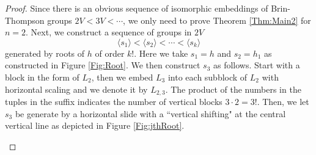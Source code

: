 \documentclass[10pt,a4paper]{amsart}
\begin{document}
\begin{proof} 
         Since there is an obvious sequence of isomorphic embeddings of 
         Brin-Thompson groups  $2V < 3V < \cdots$, 
         we only need to prove Theorem  \ref{Thm:Main2}  for  $n = 2$. 
 	Next, we construct a sequence of groups in $2V$
	\begin{equation}\label{Eq:seq} 
		\langle s_1 \rangle  <  \langle s_2 \rangle  < \cdots <  \langle s_k \rangle 
	\end{equation}
	generated by roots of  $h$  of order $k!$.
	Here we take $s_1 = h$ and $s_2 = h_1$ 
	as constructed in Figure \ref{Fig:Root}.
	We then construct $s_3$ as follows.   
	Start with a block in the form of  $L_2$, 
	then we embed  $L_3$  into each subblock of $L_2$  with horizontal scaling 
	and we denote it by $L_{2,3}$.  
	The product of the numbers in the tuples in the suffix 
	indicates the number of vertical blocks  $3\cdot 2 = 3!$.  
	Then, 
	we let  $s_3$  be generate by a horizontal slide with  
	a ``vertical shifting" at the central vertical line
	as depicted in Figure \ref{Fig:jthRoot}.
 	\begin{figure}[htp]
		\begin{center}
\end{center}
\end{figure}
\end{proof}
\end{document}
